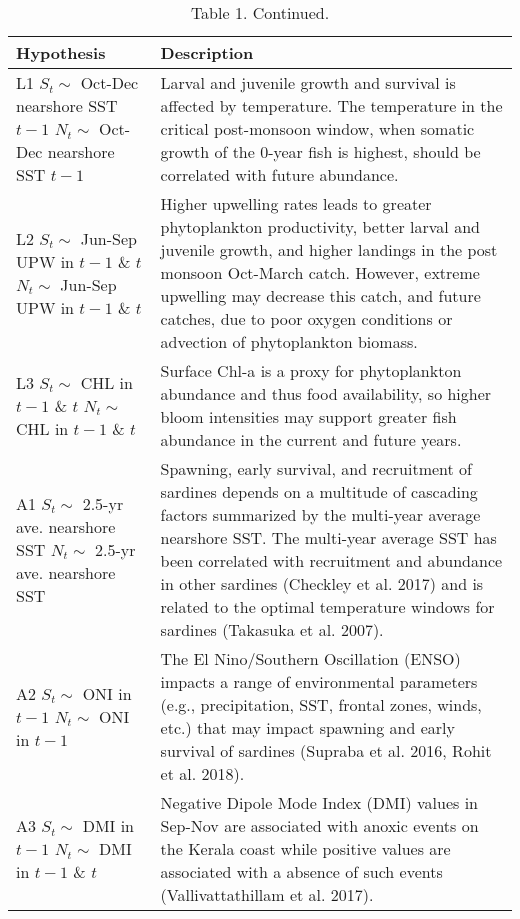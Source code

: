 \begin{table}

\caption{\label{tab:unnamed-chunk-2}Table 1. Continued.}
\centering
\begin{tabular}[t]{>{\raggedright\arraybackslash}p{5.5cm}|>{\raggedright\arraybackslash}p{10cm}}
\hline
Hypothesis & Description\\
\hline
L1 \newline $S_t \sim$ Oct-Dec nearshore SST $t-1$ \newline $N_t \sim$ Oct-Dec nearshore SST $t-1$ & Larval and juvenile growth and survival is affected by temperature. The temperature in the critical post-monsoon window, when somatic growth of the 0-year fish is highest, should be correlated with future abundance.\\
\hline
L2 \newline $S_t \sim$ Jun-Sep UPW in $t-1$ \& $t$ \newline $N_t \sim$ Jun-Sep UPW in $t-1$ \& $t$ & Higher upwelling rates leads to greater phytoplankton productivity, better larval and juvenile growth, and higher landings in the post monsoon Oct-March catch. However, extreme upwelling may decrease this catch, and future catches, due to poor oxygen conditions or advection of phytoplankton biomass.\\
\hline
L3 \newline $S_t\sim$ CHL in $t-1$ \& $t$ \newline $N_t \sim$ CHL in $t-1$ \& $t$ & Surface Chl-a is a proxy for phytoplankton abundance and thus food availability, so higher bloom intensities may support greater fish abundance in the current and future years.\\
\hline
A1 \newline $S_t \sim$ 2.5-yr ave. nearshore SST \newline $N_t \sim$ 2.5-yr ave. nearshore SST & Spawning, early survival, and recruitment of sardines depends on a multitude of cascading factors summarized by the multi-year average  nearshore SST. The multi-year average SST has been correlated with recruitment and abundance in other sardines (Checkley et al. 2017) and is related to the optimal temperature windows for sardines (Takasuka et al. 2007).\\
\hline
A2 \newline $S_t \sim$ ONI in $t-1$ \newline $N_t \sim$ ONI in $t-1$ & The El Nino/Southern Oscillation (ENSO) impacts a range of environmental parameters (e.g., precipitation, SST, frontal zones, winds, etc.) that may impact spawning and early survival of sardines (Supraba et al. 2016, Rohit et al. 2018).\\
\hline
A3 \newline $S_t \sim$ DMI in $t-1$ \newline $N_t \sim$ DMI in $t-1$ \& $t$ & Negative Dipole Mode Index (DMI) values in Sep-Nov are associated with anoxic events on the Kerala coast while positive values are associated with a absence of such events (Vallivattathillam et al. 2017).\\
\hline
\end{tabular}
\end{table}

